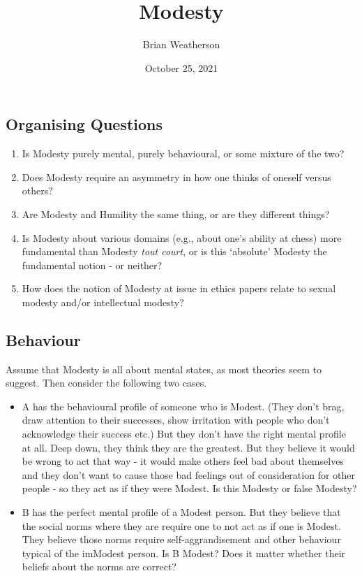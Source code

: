 \documentclass[
]{article}
\title{Modesty}
\author{Brian Weatherson}
\date{October 25, 2021}
\providecommand{\tightlist}{%
  \setlength{\itemsep}{0pt}\setlength{\parskip}{0pt}}
\begin{document}
\maketitle

\hypertarget{organising-questions}{%
\subsection{Organising Questions}\label{organising-questions}}

\begin{enumerate}
\def\labelenumi{\arabic{enumi}.}
\tightlist
\item
  Is Modesty purely mental, purely behavioural, or some mixture of the
  two?
\item
  Does Modesty require an asymmetry in how one thinks of oneself versus
  others?
\item
  Are Modesty and Humility the same thing, or are they different things?
\item
  Is Modesty about various domains (e.g., about one's ability at chess)
  more fundamental than Modesty \emph{tout court}, or is this `absolute'
  Modesty the fundamental notion - or neither?
\item
  How does the notion of Modesty at issue in ethics papers relate to
  sexual modesty and/or intellectual modesty?
\end{enumerate}

\hypertarget{behaviour}{%
\subsection{Behaviour}\label{behaviour}}

Assume that Modesty is all about mental states, as most theories seem to
suggest. Then consider the following two cases.

\begin{itemize}
\tightlist
\item
  A has the behavioural profile of someone who is Modest. (They don't
  brag, draw attention to their successes, show irritation with people
  who don't acknowledge their success etc.) But they don't have the
  right mental profile at all. Deep down, they think they are the
  greatest. But they believe it would be wrong to act that way - it
  would make others feel bad about themselves and they don't want to
  cause those bad feelings out of consideration for other people - so
  they act as if they were Modest. Is this Modesty or false Modesty?
\item
  B has the perfect mental profile of a Modest person. But they believe
  that the social norms where they are require one to not act as if one
  is Modest. They believe those norms require self-aggrandisement and
  other behaviour typical of the imModest person. Is B Modest? Does it
  matter whether their beliefs about the norms are correct?
\end{itemize}
\end{document}
